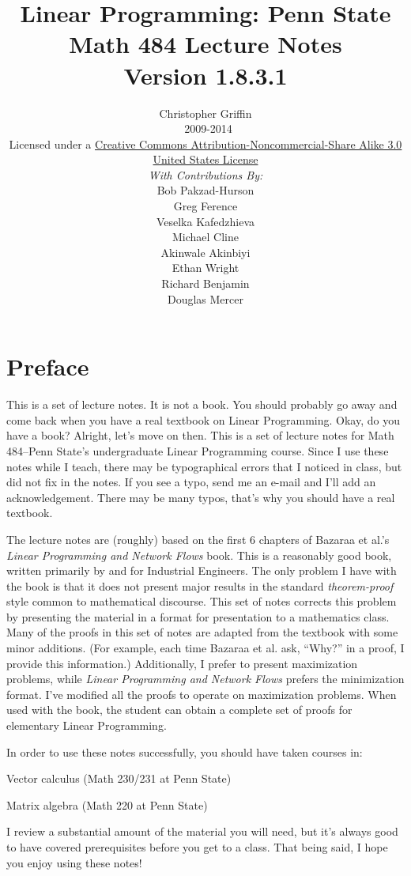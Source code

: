 \documentclass[leqno,fleqn,12pt,titlepage]{amsbook}
\title{Linear Programming: Penn State Math 484 Lecture Notes\\
		{\small Version 1.8.3.1}\\
		}
\author{
	Christopher Griffin\\
	\textcopyleft~2009-2014\\
	\vspace*{1em}
	{\scriptsize Licensed under a 
	\href{http://creativecommons.org/licenses/by-nc-sa/3.0/us/}
	{Creative Commons Attribution-Noncommercial-Share Alike 3.0 United States License}}
	\\
	{\small \textit{With Contributions By:}\\
	Bob Pakzad-Hurson\\ Greg Ference\\ Veselka Kafedzhieva\\ Michael Cline\\
	Akinwale Akinbiyi\\Ethan Wright\\
	Richard Benjamin\\
	Douglas Mercer\\}
	
	
}
\date{}
\numberwithin{equation}{chapter}
\numberwithin{figure}{chapter}
\theoremstyle{definition}
\theoremstyle{remark}
\begin{document}
\frontmatter


\maketitle
\tableofcontents

\listoffigures


\chapter*{Preface}
This is a set of lecture notes. It is not a book. You should probably go away and come back when you have a real textbook on Linear Programming. Okay, do you have a book? Alright, let's move on then. This is a set of lecture notes for Math 484--Penn State's undergraduate Linear Programming course. Since I use these notes while I teach, there may be typographical errors that I noticed in class, but did not fix in the notes. If you see a typo, send me an e-mail and I'll add an acknowledgement. There may be many typos, that's why you should have a real textbook.

The lecture notes are (roughly) based on the first 6 chapters of Bazaraa et al.'s \textit{Linear Programming and Network Flows} book. This is a reasonably good book, written primarily by and for Industrial Engineers. The only problem I have with the book is that it does not present major results in the standard \textit{theorem-proof} style common to mathematical discourse. This set of notes corrects this problem by presenting the material in a format for presentation to a mathematics class. Many of the proofs in this set of notes are adapted from the textbook with some minor additions. (For example, each time Bazaraa et al. ask, ``Why?'' in a proof, I provide this information.) Additionally, I prefer to present maximization problems, while \textit{Linear Programming and Network Flows} prefers the minimization format. I've modified all the proofs to operate on maximization problems. When used with the book, the student can obtain a complete set of proofs for elementary Linear Programming.

In order to use these notes successfully, you should have taken courses in:
\begin{enumerate*}
\item Vector calculus (Math 230/231 at Penn State)
\item Matrix algebra (Math 220 at Penn State)
\end{enumerate*}
I review a substantial amount of the material you will need, but it's always good to have covered prerequisites before you get to a class. That being said, I hope you enjoy using these notes!
\mainmatter









\backmatter


\end{document}
